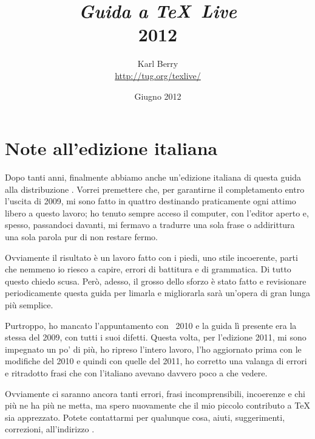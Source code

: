 \documentclass{article}
\begin{document}
\title{%
  {\huge \textit{Guida a \TeX\ Live}\\\smallskip}%
  {\LARGE \textsf{\TL{} 2012}}%
}

\author{Karl Berry\\[3mm]
        \url{http://tug.org/texlive/}
       }

\date{Giugno 2012}

\maketitle

\begin{multicols}{2}
\tableofcontents
\end{multicols}


\section*{Note all'edizione italiana}

Dopo tanti anni, finalmente abbiamo anche un'edizione italiana di questa
guida alla distribuzione \TL. Vorrei premettere che, per garantirne il
completamento entro l'uscita di \TL{} 2009, mi sono fatto in quattro
destinando praticamente ogni attimo libero a questo lavoro; ho tenuto
sempre acceso il computer, con l'editor aperto e, spesso, passandoci
davanti, mi fermavo a tradurre una sola frase o addirittura una sola
parola pur di non restare fermo.

Ovviamente il risultato è un lavoro fatto con i piedi, uno stile
incoerente, parti che nemmeno io riesco a capire, errori di battitura e di
grammatica. Di tutto questo chiedo scusa. Però, adesso, il grosso dello
sforzo è stato fatto e revisionare periodicamente questa guida per limarla
e migliorarla sarà un'opera di gran lunga più semplice.

Purtroppo, ho mancato l'appuntamento con \TL\ 2010 e la guida lì presente
era la stessa del 2009, con tutti i suoi difetti. Questa volta, per
l'edizione 2011, mi sono impegnato un po' di più, ho ripreso l'intero
lavoro, l'ho aggiornato prima con le modifiche del 2010 e quindi con quelle
del 2011, ho corretto una valanga di errori e ritradotto frasi che con
l'italiano avevano davvero poco a che vedere.

Ovviamente ci saranno ancora tanti errori, frasi incomprensibili, incoerenze
e chi più ne ha più ne metta, ma spero nuovamente che il mio piccolo
contributo a \TeX{} sia apprezzato. Potete contattarmi per qualunque cosa,
aiuti, suggerimenti, correzioni, all'indirizzo
.
\end{document}

